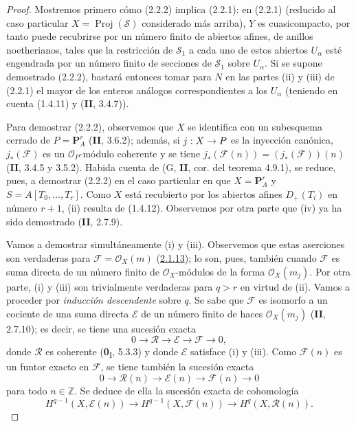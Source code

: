 \documentclass[10pt,oneside,openany]{book}
\theoremstyle{egaenv}\newtheorem*{env}{---}
\theoremstyle{egastatement}
\theoremstyle{egadescription}
\newcommand{\oldpage}[2][]{\marginnote{\normalfont\scriptsize\textbf{#1}\,|\,#2}\ignorespaces}
\renewcommand{\to}{\mathchoice{\longrightarrow}{\rightarrow}{\rightarrow}{\rightarrow}}
\begin{document}
\begin{proof}
Mostremos primero cómo (2.2.2) implica (2.2.1): en (2.2.1) (reducido al caso particular $X=\operatorname{Proj}(\mathcal S)$ considerado más arriba), $Y$ es cuasicompacto, por tanto puede recubrirse por un número finito de abiertos afines, de anillos noetherianos, tales que la restricción de $\mathcal S_1$ a cada uno de estos abiertos $U_\alpha$ esté engendrada por un número finito de secciones de $\mathcal S_1$ sobre $U_\alpha$. Si se supone demostrado (2.2.2), bastará entonces tomar para $N$ en las partes (ii) y (iii) de (2.2.1) el mayor de los enteros análogos correspondientes a los $U_\alpha$ (teniendo en cuenta (1.4.11) y (\textbf{II}, 3.4.7)).

Para demostrar (2.2.2), observemos que $X$ se identifica con un subesquema cerrado de $P=\mathbf P_A^r$ (\textbf{II}, 3.6.2); además, si $j:X\to P$ es la inyección canónica, $j_*(\mathcal F)$ es un $\mathcal O_P$-módulo coherente y se tiene $j_*(\mathcal F(n))=(j_*(\mathcal F))(n)$ (\textbf{II}, 3.4.5 y 3.5.2). Habida cuenta de (G, \textbf{II}, cor. del teorema 4.9.1), se reduce, pues, a demostrar (2.2.2) en el caso particular en que $X=\mathbf P_A^r$ y $S=A[T_0,\ldots,T_r]$. Como $X$ está recubierto por los abiertos
\oldpage[III]{101}
afines $D_+(T_i)$ en número $r+1$, (ii) resulta de (1.4.12). Observemos por otra parte que (iv) ya ha sido demostrado (\textbf{II}, 2.7.9).

Vamos a demostrar simultáneamente (i) y (iii). Observemos que estas aserciones son verdaderas para $\mathcal F=\mathcal O_X(m)$ (\hyperref[III.2.1.13-fr]{2.1.13}); lo son, pues, también cuando $\mathcal F$ es suma directa de un número finito de $\mathcal O_X$-módulos de la forma $\mathcal O_X(m_j)$. Por otra parte, (i) y (iii) son trivialmente verdaderas para $q>r$ en virtud de (ii). Vamos a proceder por \emph{inducción descendente} sobre $q$. Se sabe que $\mathcal F$ es isomorfo a un cociente de una suma directa $\mathcal E$ de un número finito de haces $\mathcal O_X(m_j)$ (\textbf{II}, 2.7.10); es decir, se tiene una sucesión exacta
\[
0\longrightarrow\mathcal R\longrightarrow\mathcal E
\longrightarrow\mathcal F\longrightarrow0,
\]
donde $\mathcal R$ es coherente (\textbf{0}\textsubscript{I}, 5.3.3) y donde $\mathcal E$ satisface (i) y (iii). Como $\mathcal F(n)$ es un funtor exacto en $\mathcal F$, se tiene también la sucesión exacta
\[
0\longrightarrow\mathcal R(n)\longrightarrow\mathcal E(n)
\longrightarrow\mathcal F(n)\longrightarrow0
\]
para todo $n\in\mathbb Z$. Se deduce de ella la sucesión exacta de cohomología
\[
H^{q-1}(X,\mathcal E(n))\longrightarrow
H^{q-1}(X,\mathcal F(n))\longrightarrow
H^q(X,\mathcal R(n)).
\]


\end{proof}
\end{document}
